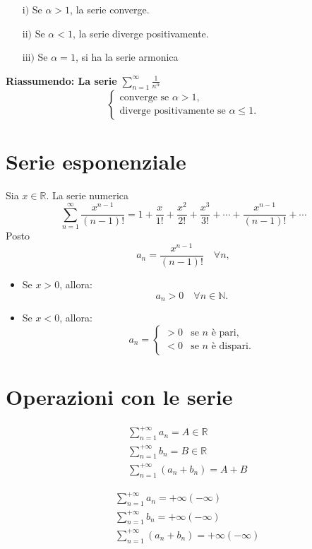 \documentclass{article}
\begin{document}
\begin{itemize}
    \item[\( \text{i)} \)] Se \(\alpha > 1\), la serie converge.
    \item[\( \text{ii)} \)] Se \(\alpha < 1\), la serie diverge positivamente.
     \item[\( \text{iii)} \)] Se \(\alpha = 1\), si ha la serie armonica
\end{itemize}

\textbf{Riassumendo: La serie} 
\( \sum_{n=1}^{\infty} \frac{1}{n^{\alpha}} \)
\[
\begin{cases}
    \text{converge se } \alpha > 1, \\
    \text{diverge positivamente se } \alpha \leq 1.
\end{cases}
\]
\section{Serie esponenziale}
Sia $x \in \mathbb{R}$. La serie numerica 
\[
\sum_{n=1}^{\infty} \frac{x^{n-1}}{(n-1)!} = 1 + \frac{x}{1!} + \frac{x^2}{2!} + \frac{x^3}{3!} + \cdots + \frac{x^{n-1}}{(n-1)!} + \cdots
\]
Posto
\[
a_n = \frac{x^{n-1}}{(n-1)!} \quad \forall n,
\]

\begin{itemize}
    \item Se $x > 0$, allora:
    \[
    a_n > 0 \quad \forall n \in \mathbb{N}.
    \]
    \item Se $x < 0$, allora:
    \[
    a_n =
    \begin{cases} 
        > 0 & \text{se } n \text{ è pari}, \\ 
        < 0 & \text{se } n \text{ è dispari}.
    \end{cases}
    \]
\end{itemize}
\section*{Operazioni con le serie}
\begin{align*}
    &\sum_{n=1}^{+\infty} a_n  = A \in \mathbb{R}\\
    &\sum_{n=1}^{+\infty} b_n = B \in \mathbb{R} \\
    &\sum_{n=1}^{+\infty} (a_n +b_n) = A+B
\end{align*}

\begin{align*}
    &\sum_{n=1}^{+\infty} a_n  = +\infty (-\infty)\\
    &\sum_{n=1}^{+\infty} b_n = +\infty (-\infty) \\
    &\sum_{n=1}^{+\infty} (a_n +b_n) = +\infty (-\infty)
\end{align*}
\end{document}
